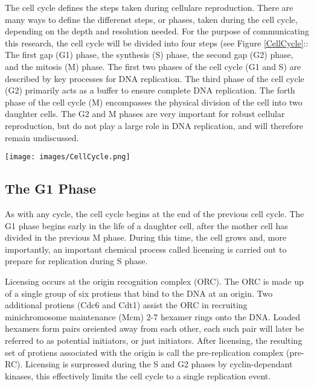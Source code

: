 	The cell cycle defines the steps taken during cellulare reproduction.
	There are many ways to define the differenst steps, or phases, taken during the cell cycle, depending on the depth and resolution needed.
	For the purpose of communicating this research, the cell cycle will be divided into four steps (see Figure \ref{CellCycle}::
	The first gap (G1) phase, the synthesis (S) phase, the second gap (G2) phase, and the mitosis (M) phase.
	The first two phases of the cell cycle (G1 and S) are described by key processes for DNA replication.
	The third phase of the cell cycle (G2) primarily acts as a buffer to ensure complete DNA replication.
	The forth phase of the cell cycle (M) encompasses the physical division of the cell into two daughter cells.
	The G2 and M phases are very important for robust cellular reproduction, but do not play a large role in DNA replication, and will therefore remain undiscussed.
	
	\begin{SCfigure}[1][thb]
		\texttt{[image: images/CellCycle.png]}
		\caption[Cell Cycle]{\label{CellCycle} The complete cell cycle is made up of four phases: 
			The Mitosis (M) phase, when a mother cell separates into two daughter cells. 
			The first Gap (G1) phase, when the daughter cell undergoes growth and chemical preperation for DNA replication.
			The Synthesis (S) phase, when the DNA is replicated.
			And the second Gap (G2) phase which acts as a buffer to ensure complete replication before the M phase.}
	\end{SCfigure}
	
		\subsection{The G1 Phase}
		
		As with any cycle, the cell cycle begins at the end of the previous cell cycle.
		The G1 phase begins early in the life of a daughter cell, after the mother cell has divided in the previous M phase.
		During this time, the cell grows and, more importantly, an important chemical process called licensing is carried out to prepare for replication during S phase.
		
		Licensing occurs at the origin recognition complex (ORC).
		The ORC is made up of a single group of six protiens that bind to the DNA at an origin.
		Two additional protiens (Cdc6 and Cdt1) assist the ORC in recruiting minichromosome maintenance (Mcm) 2-7 hexamer rings onto the DNA.
		Loaded hexamers form pairs oreiented away from each other, each such pair will later be referred to as potential initiators, or just initiators.
		After licensing, the resulting set of protiens associated with the origin is call the pre-replication complex (pre-RC).
		Licensing is surpressed during the S and G2 phases by cyclin-dependant kinases, this effectively limits the cell cycle to a single replication event.\cite{MolecularCellBiology}
		

